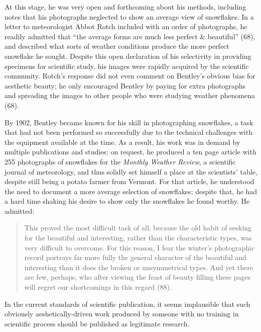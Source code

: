 At this stage, he was very open and forthcoming about his methods, including
notes that his photographs neglected to show an average view of snowflakes. In a
letter to meteorologist Abbot Rotch included with an order of photographs, he
readily admitted that ``the average forms are much less perfect \& beautiful''
(68), and described what sorts of weather conditions produce the more perfect
snowflake he sought. Despite this open declaration of his selectivity in
providing specimens for scientific study, his images were rapidly acquired by
the scientific community. Rotch's response did not even comment on Bentley's
obvious bias for aesthetic beauty; he only encouraged Bentley by paying for
extra photographs and spreading the images to other people who were studying
weather phenomena (68).

By 1902, Bentley became known for his skill in photographing snowflakes, a task
that had not been performed so successfully due to the technical challenges with
the equipment available at the time. As a result, his work was in demand by
multiple publications and studies; on request, he produced a ten page article
with 255 photographs of snowflakes for the \textit{Monthly Weather Review}, a
scientific journal of meteorology, and thus solidly set himself a place at the
scientists' table, despite still being a potato farmer from Vermont. For that
article, he understood the need to document a more average selection of
snowflakes; despite that, he had a hard time shaking his desire to show only the
snowflakes he found worthy. He admitted: \begin{quote}	This proved the most
difficult task of all, because the old habit of seeking for the beautiful and
interesting, rather than the characteristic types, was very difficult to
overcome. For this reason, I fear the winter's photographic record portrays far
more fully the general character of the beautiful and interesting than it does
the broken or unsymmetrical types. And yet there are few, perhaps, who after
viewing the feast of beauty filling these pages will regret our shortcomings in
this regard (88).\end{quote} In the current standards of scientific publication,
it seems implausible that such obviously aeshetically-driven work produced by
someone with no training in scientific process should be published as legitimate
research.

